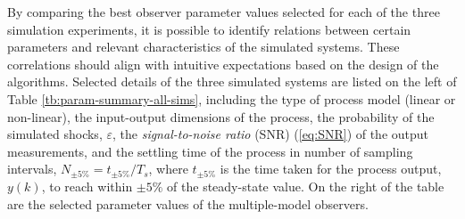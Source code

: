 By comparing the best observer parameter values selected for each of the three simulation experiments, it is possible to identify relations between certain parameters and relevant characteristics of the simulated systems. These correlations should align with intuitive expectations based on the design of the algorithms. Selected details of the three simulated systems are listed on the left of Table \ref{tb:param-summary-all-sims}, including the type of process model (linear or non-linear), the input-output dimensions of the process, the probability of the simulated shocks, $\varepsilon$, the \textit{signal-to-noise ratio} (SNR) (\ref{eq:SNR}) of the output measurements, and the settling time of the process in number of sampling intervals, $N_{\pm5\%}=t_{\pm 5\%} / T_s$, where $t_{\pm5\%}$ is the time taken for the process output, $y(k)$, to reach within $\pm5\%$ of the steady-state value. On the right of the table are the selected parameter values of the multiple-model observers.
